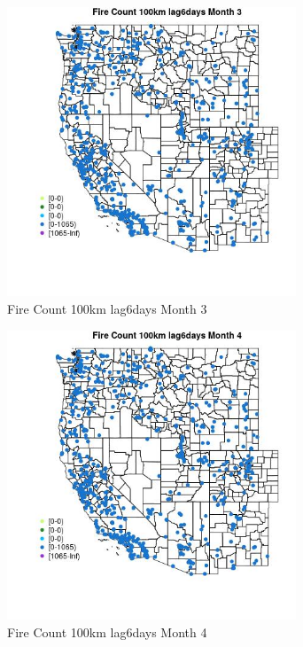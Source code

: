 \begin{figure} 
\centering  
\includegraphics[width=0.77\textwidth]{Code_Outputs/Report_ML_input_PM25_Step4_part_f_de_duplicated_aves_prioritize_24hr_obswNAs_MapObsMo3Fire_Count_100km_lag6days.jpg} 
\caption{\label{fig:Report_ML_input_PM25_Step4_part_f_de_duplicated_aves_prioritize_24hr_obswNAsMapObsMo3Fire_Count_100km_lag6days}Fire Count 100km lag6days Month 3} 
\end{figure} 
 

\begin{figure} 
\centering  
\includegraphics[width=0.77\textwidth]{Code_Outputs/Report_ML_input_PM25_Step4_part_f_de_duplicated_aves_prioritize_24hr_obswNAs_MapObsMo4Fire_Count_100km_lag6days.jpg} 
\caption{\label{fig:Report_ML_input_PM25_Step4_part_f_de_duplicated_aves_prioritize_24hr_obswNAsMapObsMo4Fire_Count_100km_lag6days}Fire Count 100km lag6days Month 4} 
\end{figure} 
 

